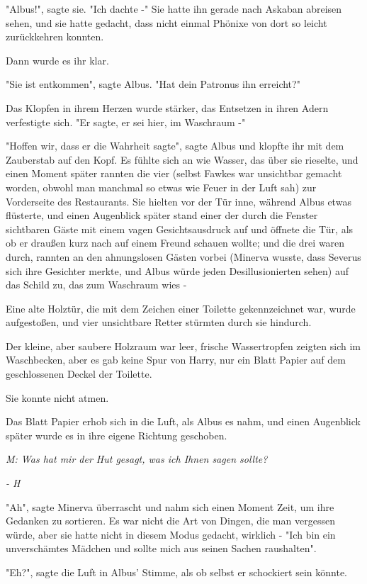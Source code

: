 {"Albus!", sagte sie. "Ich dachte -" Sie hatte ihn gerade nach Askaban abreisen sehen, und sie hatte gedacht, dass nicht einmal Phönixe von dort so leicht zurückkehren konnten.

Dann wurde es ihr klar.

"Sie ist entkommen", sagte Albus. "Hat dein Patronus ihn erreicht?"

Das Klopfen in ihrem Herzen wurde stärker, das Entsetzen in ihren Adern verfestigte sich. "Er sagte, er sei hier, im Waschraum -"

"Hoffen wir, dass er die Wahrheit sagte", sagte Albus und klopfte ihr mit dem Zauberstab auf den Kopf. Es fühlte sich an wie Wasser, das über sie rieselte, und einen Moment später rannten die vier (selbst Fawkes war unsichtbar gemacht worden, obwohl man manchmal so etwas wie Feuer in der Luft sah) zur Vorderseite des Restaurants. Sie hielten vor der Tür inne, während Albus etwas flüsterte, und einen Augenblick später stand einer der durch die Fenster sichtbaren Gäste mit einem vagen Gesichtsausdruck auf und öffnete die Tür, als ob er draußen kurz nach auf einem Freund schauen wollte; und die drei waren durch, rannten an den ahnungslosen Gästen vorbei (Minerva wusste, dass Severus sich ihre Gesichter merkte, und Albus würde jeden Desillusionierten sehen) auf das Schild zu, das zum Waschraum wies -

Eine alte Holztür, die mit dem Zeichen einer Toilette gekennzeichnet war, wurde aufgestoßen, und vier unsichtbare Retter stürmten durch sie hindurch.

Der kleine, aber saubere Holzraum war leer, frische Wassertropfen zeigten sich im Waschbecken, aber es gab keine Spur von Harry, nur ein Blatt Papier auf dem geschlossenen Deckel der Toilette.

Sie konnte nicht atmen.

Das Blatt Papier erhob sich in die Luft, als Albus es nahm, und einen Augenblick später wurde es in ihre eigene Richtung geschoben.

\emph{M: Was hat mir der Hut gesagt, was ich Ihnen sagen sollte?}

\emph{- H}

"Ah", sagte Minerva überrascht und nahm sich einen Moment Zeit, um ihre Gedanken zu sortieren. Es war nicht die Art von Dingen, die man vergessen würde, aber sie hatte nicht in diesem Modus gedacht, wirklich - "Ich bin ein unverschämtes Mädchen und sollte mich aus seinen Sachen raushalten".

"Eh?", sagte die Luft in Albus' Stimme, als ob selbst er schockiert sein könnte.

}
